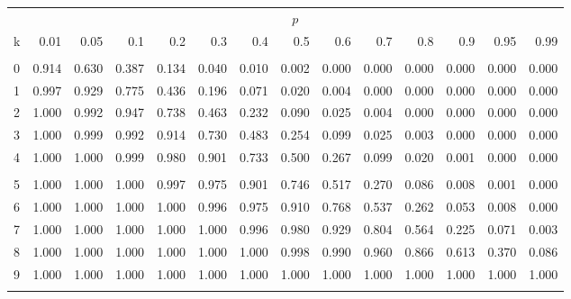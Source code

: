 \documentclass[
]{article}
\begin{document}
\begin{longtable}[t]{lrrrrrrrrrrrrr}
\toprule
\multicolumn{1}{c}{ } & \multicolumn{13}{c}{$p$} \\
\cmidrule(l{3pt}r{3pt}){2-14}
k & 0.01 & 0.05 & 0.1 & 0.2 & 0.3 & 0.4 & 0.5 & 0.6 & 0.7 & 0.8 & 0.9 & 0.95 & 0.99\\
\midrule
\addlinespace[0.3em]
\multicolumn{14}{l}{$n=9$}\\
\hspace{1em}0 & 0.914 & 0.630 & 0.387 & 0.134 & 0.040 & 0.010 & 0.002 & 0.000 & 0.000 & 0.000 & 0.000 & 0.000 & 0.000\\
\hspace{1em}1 & 0.997 & 0.929 & 0.775 & 0.436 & 0.196 & 0.071 & 0.020 & 0.004 & 0.000 & 0.000 & 0.000 & 0.000 & 0.000\\
\hspace{1em}2 & 1.000 & 0.992 & 0.947 & 0.738 & 0.463 & 0.232 & 0.090 & 0.025 & 0.004 & 0.000 & 0.000 & 0.000 & 0.000\\
\hspace{1em}3 & 1.000 & 0.999 & 0.992 & 0.914 & 0.730 & 0.483 & 0.254 & 0.099 & 0.025 & 0.003 & 0.000 & 0.000 & 0.000\\
\hspace{1em}4 & 1.000 & 1.000 & 0.999 & 0.980 & 0.901 & 0.733 & 0.500 & 0.267 & 0.099 & 0.020 & 0.001 & 0.000 & 0.000\\
\addlinespace[-.7em]
\multicolumn{14}{l}{ }\\
\hspace{1em}5 & 1.000 & 1.000 & 1.000 & 0.997 & 0.975 & 0.901 & 0.746 & 0.517 & 0.270 & 0.086 & 0.008 & 0.001 & 0.000\\
\hspace{1em}6 & 1.000 & 1.000 & 1.000 & 1.000 & 0.996 & 0.975 & 0.910 & 0.768 & 0.537 & 0.262 & 0.053 & 0.008 & 0.000\\
\hspace{1em}7 & 1.000 & 1.000 & 1.000 & 1.000 & 1.000 & 0.996 & 0.980 & 0.929 & 0.804 & 0.564 & 0.225 & 0.071 & 0.003\\
\hspace{1em}8 & 1.000 & 1.000 & 1.000 & 1.000 & 1.000 & 1.000 & 0.998 & 0.990 & 0.960 & 0.866 & 0.613 & 0.370 & 0.086\\
\hspace{1em}9 & 1.000 & 1.000 & 1.000 & 1.000 & 1.000 & 1.000 & 1.000 & 1.000 & 1.000 & 1.000 & 1.000 & 1.000 & 1.000\\
\addlinespace[0.3em]
\multicolumn{14}{l}{$n=10$}\\

\end{longtable}
\end{document}
